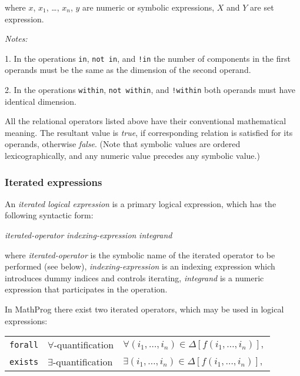 \documentclass[10pt]{article}
\begin{document}
\medskip

\noindent where $x$, $x_1$, \dots, $x_n$, $y$ are numeric or symbolic
expressions, $X$ and $Y$ are set expression.

{\it Notes:}

1. In the operations {\tt in}, {\tt not in}, and {\tt !in} the
number of components in the first operands must be the same as the
dimension of the second operand.

2. In the operations {\tt within}, {\tt not within}, and {\tt !within}
both operands must have identical dimension.

All the relational operators listed above have their conventional
mathematical meaning. The resultant value is {\it true}, if
corresponding relation is satisfied for its operands, otherwise
{\it false}. (Note that symbolic values are ordered lexicographically,
and any numeric value precedes any symbolic value.)

\subsubsection{Iterated expressions}

An {\it iterated logical expression} is a primary logical expression,
which has the following syntactic form:

\medskip

\noindent\hfil
{\it iterated-operator} {\it indexing-expression} {\it integrand}

\medskip

\noindent where {\it iterated-operator} is the symbolic name of the
iterated operator to be performed (see below), {\it indexing-expression}
is an indexing expression which introduces dummy indices and controls
iterating, {\it integrand} is a numeric expression that participates in
the operation.

In MathProg there exist two iterated operators, which may be used in
logical expressions:

\medskip

\noindent\hfil
\begin{tabular}{@{}lll@{}}
{\tt forall}&$\forall$-quantification&$\displaystyle
\forall(i_1,\dots,i_n)\in\Delta[f(i_1,\dots,i_n)],$\\
{\tt exists}&$\exists$-quantification&$\displaystyle
\exists(i_1,\dots,i_n)\in\Delta[f(i_1,\dots,i_n)],$\\
\end{tabular}

\medskip
\end{document}
